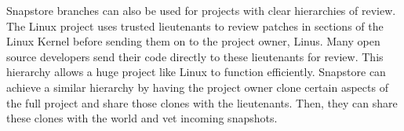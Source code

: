 Snapstore branches can also be used for projects with clear hierarchies of review. The Linux project uses trusted lieutenants to review patches in sections of the Linux Kernel before sending them on to the project owner, Linus. Many open source developers send their code directly to these lieutenants for review. This hierarchy allows a huge project like Linux to function efficiently. Snapstore can achieve a similar hierarchy by having the project owner clone certain aspects of the full project and share those clones with the lieutenants. Then, they can share these clones with the world and vet incoming snapshots.


